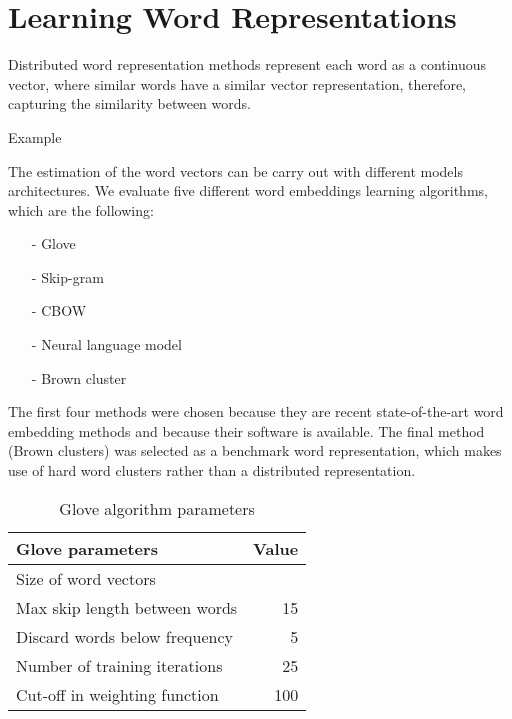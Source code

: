 
\section{Learning Word Representations}


Distributed word representation methods represent each word as a continuous vector, where similar words have a similar vector representation, therefore, capturing
the similarity between words.

{\color{red}Example}

The estimation of the word vectors can be carry out with different models architectures. We evaluate five different word embeddings learning algorithms, which are the following: 
 
\begin{itemize}
\item[-] Glove \cite{pennington2014glove}
\item[-] Skip-gram \cite{Mikolov13}
\item[-] CBOW \cite{Mikolov13}
\item[-] Neural language model \cite{collobert2011natural}
\item[-] Brown cluster \cite{Brown92class-basedn-gram}
\end{itemize}

The first four methods were chosen because they are recent
state-of-the-art word embedding methods and because their software is
available. The final method (Brown clusters) was selected as a benchmark word representation, which makes use of hard word clusters rather than a distributed representation.



\begin{table}
\centering
\begin{small}
\begin{tabular}{lr}
\hline
\textbf{Glove parameters}  & \textbf{Value} \\ \hline
Size of word vectors &  \\
Max skip length between words & 15 \\ 
Discard words below frequency & 5 \\
Number of training iterations & 25 \\
Cut-off in weighting function & 100 \\ \hline
\end{tabular}
\label{glove}
\caption{Glove algorithm parameters}
\end{small}
\end{table}


